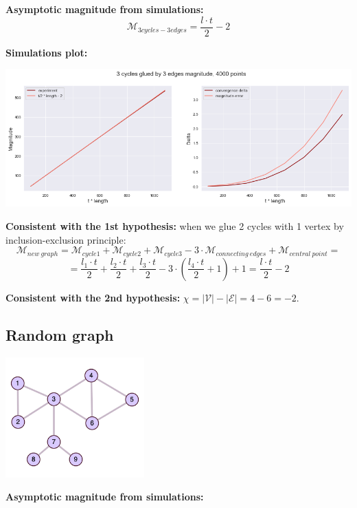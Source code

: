 \documentclass{article}
\begin{document}
\textbf{Asymptotic magnitude from simulations:}
\\

$$\mathcal{M}_{3cycles-3edges} = \frac{l \cdot t}{2} - 2$$

\textbf{Simulations plot:} 

\begin{center}
\includegraphics[width=\textwidth]{3cycles3edges_plot}
\end{center}

\textbf{Consistent with the 1st hypothesis:} when we glue 2 cycles with 1 vertex by inclusion-exclusion
principle: $$\mathcal{M}_{new \ graph} = \mathcal{M}_{cycle1} + \mathcal{M}_{cycle2} + \mathcal{M}_{cycle3}
- 3 \cdot \mathcal{M}_{connecting \ edges} + \mathcal{M}_{central \ point} =$$ 
$$ = \frac{l_1 \cdot t}{2} + \frac{l_2 \cdot t}{2} + \frac{l_3 \cdot t}{2} - 3 \cdot (\frac{l_4 \cdot t}{2} + 1) + 1 
= \frac{l \cdot t}{2} - 2$$ 

\textbf{Consistent with the 2nd hypothesis:} $\chi = |\mathcal{V}| - |\mathcal{E}| = 4 - 6 = -2$.

\subsection{Random graph}

\begin{center}
\includegraphics[width=0.4\textwidth]{random_exp}
\end{center}

\textbf{Asymptotic magnitude from simulations:}
\\
\end{document}
